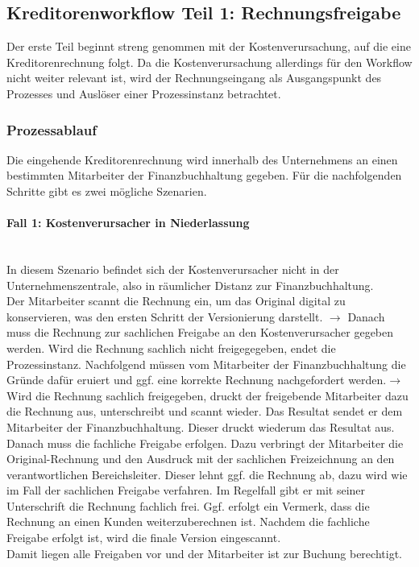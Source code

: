 \subsection{Kreditorenworkflow Teil 1: Rechnungsfreigabe}
Der erste Teil beginnt streng genommen mit der Kostenverursachung, auf die eine Kreditorenrechnung folgt. 
Da die Kostenverursachung allerdings für den Workflow nicht weiter relevant ist, wird der Rechnungseingang als Ausgangspunkt des Prozesses und Auslöser einer Prozessinstanz betrachtet. 
\subsubsection{Prozessablauf}
Die eingehende Kreditorenrechnung wird innerhalb des Unternehmens an einen bestimmten Mitarbeiter der Finanzbuchhaltung gegeben.
Für die nachfolgenden Schritte gibt es zwei mögliche Szenarien.

\paragraph{Fall 1: Kostenverursacher in Niederlassung}
~\\ 
In diesem Szenario befindet sich der Kostenverursacher nicht in der Unternehmenszentrale, also in räumlicher Distanz zur Finanzbuchhaltung.\\
Der Mitarbeiter scannt die Rechnung ein, um das Original digital zu konservieren, was den ersten Schritt der Versionierung darstellt. $\rightarrow$
Danach muss die Rechnung zur sachlichen Freigabe an den Kostenverursacher gegeben werden. 
Wird die Rechnung sachlich nicht freigegegeben, endet die Prozessinstanz.
Nachfolgend müssen vom Mitarbeiter der Finanzbuchhaltung die Gründe dafür eruiert und ggf. eine korrekte Rechnung nachgefordert werden.$\rightarrow$
Wird die Rechnung sachlich freigegeben, druckt der freigebende Mitarbeiter dazu die Rechnung aus, unterschreibt und scannt wieder.
Das Resultat sendet er dem Mitarbeiter der Finanzbuchhaltung.
Dieser druckt wiederum das Resultat aus.
Danach muss die fachliche Freigabe erfolgen.
Dazu verbringt der Mitarbeiter die Original-Rechnung und den Ausdruck mit der sachlichen Freizeichnung an den verantwortlichen Bereichsleiter.
Dieser lehnt ggf. die Rechnung ab, dazu wird wie im Fall der sachlichen Freigabe verfahren.
Im Regelfall gibt er mit seiner Unterschrift die Rechnung fachlich frei.
Ggf. erfolgt ein Vermerk, dass die Rechnung an einen Kunden weiterzuberechnen ist. 
Nachdem die fachliche Freigabe erfolgt ist, wird die finale Version eingescannt.\\
Damit liegen alle Freigaben vor und der Mitarbeiter ist zur Buchung berechtigt.

